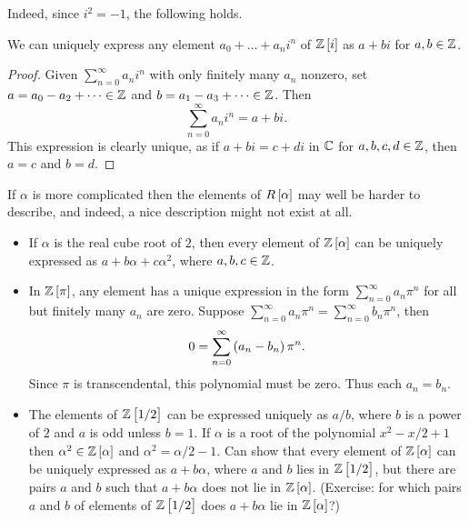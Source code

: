 Indeed, since $ i^2 = -1 $, the following holds.

\begin{proposition}
We can uniquely express any element $ a_0 + \dots + a_ni^n $ of $ \Z\sbr{i} $ as $ a + bi $ for $ a, b \in \mathbb{Z} $.
\end{proposition}

\begin{proof}
Given $ \sum_{n = 0}^\infty a_ni^n $ with only finitely many $ a_n $ nonzero, set $ a = a_0 - a_2 + \dots \in \mathbb{Z} $ and $ b = a_1 - a_3 + \dots \in \mathbb{Z} $. Then
$$ \sum_{n = 0}^\infty a_ni^n = a + bi. $$
This expression is clearly unique, as if $ a + bi = c + di $ in $ \mathbb{C} $ for $ a, b, c, d \in \mathbb{Z} $, then $ a = c $ and $ b = d $.
\end{proof}

If $ \alpha $ is more complicated then the elements of $ R\sbr{\alpha} $ may well be harder to describe, and indeed, a nice description might not exist at all.

\begin{example*}
\hfill
\begin{itemize}
\item If $ \alpha $ is the real cube root of $ 2 $, then every element of $ \Z\sbr{\alpha} $ can be uniquely expressed as $ a + b\alpha + c\alpha^2 $, where $ a, b, c \in \mathbb{Z} $.
\item In $ \Z\sbr{\pi} $, any element has a unique expression in the form $ \sum_{n = 0}^\infty a_n\pi^n $ for all but finitely many $ a_n $ are zero. Suppose $ \sum_{n = 0}^\infty a_n\pi^n = \sum_{n = 0}^\infty b_n\pi^n $, then
$$ 0 = \sum_{n = 0}^\infty \br{a_n - b_n}\pi^n. $$
Since $ \pi $ is transcendental, this polynomial must be zero. Thus each $ a_n = b_n $.
\item The elements of $ \Z\sbr{1 / 2} $ can be expressed uniquely as $ a / b $, where $ b $ is a power of $ 2 $ and $ a $ is odd unless $ b = 1 $. If $ \alpha $ is a root of the polynomial $ x^2 - x / 2 + 1 $ then $ \alpha^2 \in \Z\sbr{\alpha} $ and $ \alpha^2 = \alpha / 2 - 1 $. Can show that every element of $ \Z\sbr{\alpha} $ can be uniquely expressed as $ a + b\alpha $, where $ a $ and $ b $ lies in $ \Z\sbr{1 / 2} $, but there are pairs $ a $ and $ b $ such that $ a + b\alpha $ does not lie in $ \Z\sbr{\alpha} $. (Exercise: for which pairs $ a $ and $ b $ of elements of $ \Z\sbr{1 / 2} $ does $ a + b\alpha $ lie in $ \Z\sbr{\alpha} $?)
\end{itemize}
\end{example*}

